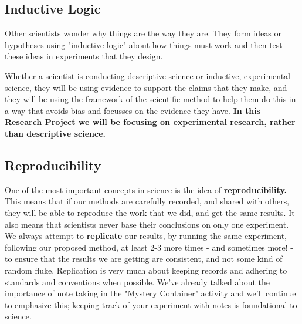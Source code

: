 \documentclass[
]{book}
\begin{document}
\hypertarget{inductive-logic}{%
\subsection*{Inductive Logic}\label{inductive-logic}}

Other scientists wonder why things are the way they are. They form ideas or hypotheses using "inductive logic" about how things must work and then test these ideas in experiments that they design.

Whether a scientist is conducting descriptive science or inductive, experimental science, they will be using evidence to support the claims that they make, and they will be using the framework of the scientific method to help them do this in a way that avoids bias and focusses on the evidence they have. \textbf{In this Research Project we will be focusing on experimental research, rather than descriptive science.}

\hypertarget{reproducibility}{%
\subsection*{Reproducibility}\label{reproducibility}}

One of the most important concepts in science is the idea of \textbf{reproducibility.} This means that if our methods are carefully recorded, and shared with others, they will be able to reproduce the work that we did, and get the same results. It also means that scientists never base their conclusions on only one experiment. We always attempt to \textbf{replicate} our results, by running the same experiment, following our proposed method, at least 2-3 more times - and sometimes more! - to ensure that the results we are getting are consistent, and not some kind of random fluke. Replication is very much about keeping records and adhering to standards and conventions when possible. We've already talked about the importance of note taking in the "Mystery Container" activity and we'll continue to emphasize this; keeping track of your experiment with notes is foundational to science.
\end{document}
